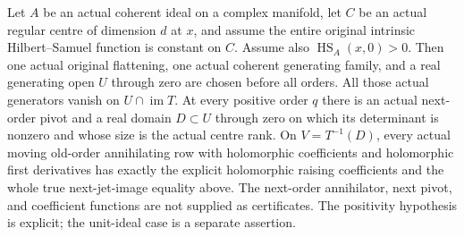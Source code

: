 \begin{theorem}
\label{hir:actual-original-hs-positive-centre-dual-jet-raising}
\leanok
Let $A$ be an actual coherent ideal on a complex manifold, let $C$ be
an actual regular centre of dimension $d$ at $x$, and assume the
entire original intrinsic Hilbert--Samuel function is constant on $C$.
Assume also $\operatorname{HS}_A(x,0)>0$. Then one actual original
flattening, one actual coherent generating family, and a real generating
open $U$ through zero are chosen before all orders. All those actual
generators vanish on $U\cap\operatorname{im}T$. At every positive order
$q$ there is an actual next-order pivot and a real domain $D\subset U$
through zero on which its determinant is nonzero and whose size is the
actual centre rank. On $V=T^{-1}(D)$, every actual moving old-order
annihilating row with holomorphic coefficients and holomorphic first
derivatives has exactly the explicit holomorphic raising coefficients
and the whole true next-jet-image equality above. The next-order
annihilator, next pivot, and coefficient functions are not supplied as
certificates. The positivity hypothesis is explicit; the unit-ideal
case is a separate assertion.
\end{theorem}
